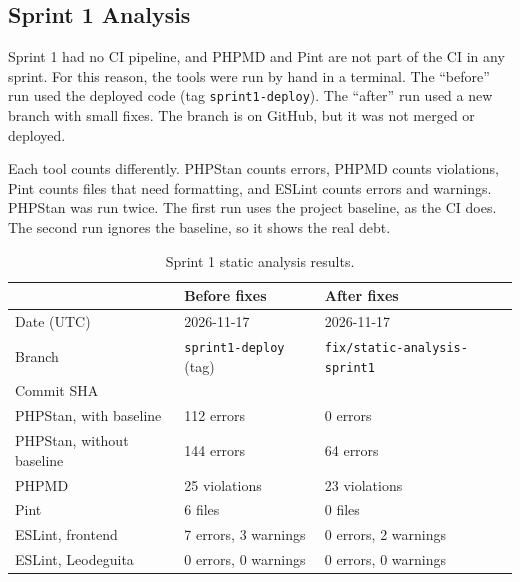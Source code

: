 \subsection{Sprint 1 Analysis}
\label{sec:static-sprint1}

Sprint 1 had no CI pipeline, and PHPMD and Pint are not part of the CI in any sprint.
For this reason, the tools were run by hand in a terminal.
The ``before'' run used the deployed code (tag \texttt{sprint1-deploy}).
The ``after'' run used a new branch with small fixes.
The branch is on GitHub, but it was not merged or deployed.

Each tool counts differently.
PHPStan counts errors, PHPMD counts violations, Pint counts files that need formatting, and ESLint counts errors and warnings.
PHPStan was run twice.
The first run uses the project baseline, as the CI does.
The second run ignores the baseline, so it shows the real debt.

\begin{table}[H]
  \centering
  \begin{tabularx}{\linewidth}{L{4.6cm}YY}
    \toprule
    & Before fixes & After fixes \\
    \midrule
    Date (UTC) & 2026-11-17 & 2026-11-17 \\
    Branch & \texttt{sprint1-deploy} (tag) & \texttt{fix/static-}\allowbreak\texttt{analysis-sprint1} \\
    Commit SHA &  &  \\
    \midrule
    PHPStan, with baseline & 112 errors & 0 errors \\
    PHPStan, without baseline & 144 errors & 64 errors \\
    PHPMD & 25 violations & 23 violations \\
    Pint & 6 files & 0 files \\
    ESLint, frontend & 7 errors, 3 warnings & 0 errors, 2 warnings \\
    ESLint, Leodeguita & 0 errors, 0 warnings & 0 errors, 0 warnings \\
    \bottomrule
  \end{tabularx}
  \caption{Sprint 1 static analysis results.}
  \label{tab:static-sprint1}
\end{table}



